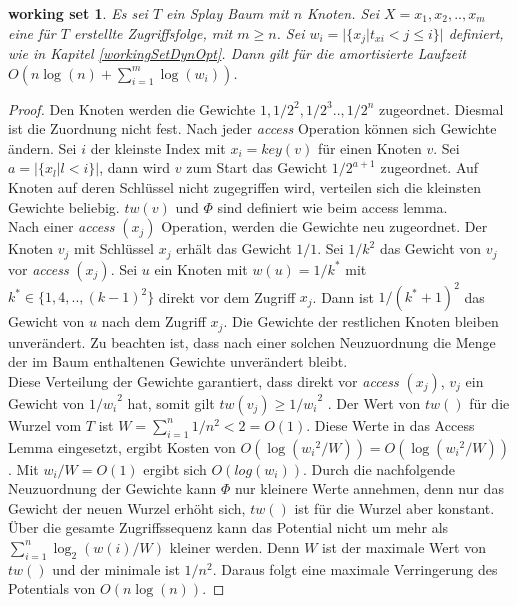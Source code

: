 \documentclass[a4paper,12pt]{article}
\begin{document}
\newtheorem{Satz2}{working set}[section] \label{workingSetSplay}
\begin{Satz2} Es sei $T$ ein Splay Baum mit $n$ Knoten. Sei $X = x_1,x_2,..,x_m$ eine für $T$ erstellte Zugriffsfolge, mit $m \geq n$. Sei ${w_i = \vert\{x_j \vert t_{xi} < j \leq i   \} \vert }$ definiert, wie in Kapitel \ref{workingSetDynOpt}. Dann gilt für die amortisierte Laufzeit \\
	$O\left( n \log\left(n\right) + \sum_{i = 1}^{m} \log\left( w_i\right) \right)$.
\end{Satz2}
\begin{proof}
	Den Knoten werden die Gewichte $1, 1/2^2,1/2^3 .., 1/2^n$ zugeordnet. Diesmal ist die Zuordnung nicht fest. Nach jeder \textit{access} Operation können sich Gewichte ändern. Sei $i$ der kleinste Index mit $x_i = \mathit{key}\left(v\right)$ für einen Knoten $v$. Sei $a = \vert\{x_l \vert l < i\}\vert$, dann wird $v$ zum Start das Gewicht $1 / 2^{a+1}$ zugeordnet. Auf Knoten auf deren Schlüssel nicht zugegriffen wird, verteilen sich die kleinsten Gewichte beliebig. $\mathit{tw}\left(v\right)$ und $\Phi$ sind definiert wie beim access lemma.\\
	Nach einer \textit{access} $\left(x_j\right)$ Operation, werden die Gewichte neu zugeordnet. Der Knoten $v_j$ mit Schlüssel $x_j$ erhält das Gewicht $1/1$. Sei $1/k^2$ das Gewicht von $v_j$ vor \textit{access} $\left(x_j\right)$. Sei $u$ ein Knoten mit $w\left(u\right) = 1 / k^*$ mit  $k^* \in \{1, 4,.., \left(k-1\right)^2\}$ direkt vor dem Zugriff $x_j$. Dann ist $1 /\left(k^* + 1\right)^2$ das Gewicht von $u$ nach dem Zugriff $x_j$. Die Gewichte der restlichen Knoten bleiben unverändert. Zu beachten ist, dass nach einer solchen Neuzuordnung die Menge der im Baum enthaltenen Gewichte unverändert bleibt. \\
	Diese Verteilung der Gewichte garantiert, dass direkt vor  \textit{access} $\left(x_j\right)$, $v_j$ ein Gewicht von ${1 /w_i}^2$ hat, somit gilt $\mathit{tw}\left(v_j\right) \geq {1 /w_i}^2$ . Der Wert von $\mathit{tw}\left(\right)$ für die Wurzel vom $T$ ist $W = \sum_{i = 1}^{n} 1/ n^2 < 2 = O\left(1\right) $. Diese Werte in das Access Lemma eingesetzt, ergibt Kosten von $O\left(\log\left({w_i}^2  / W\right)\right) = O\left(\log\left({w_i}^2 /W  \right)\right)$. Mit $w_i /W = O\left(1\right)$ ergibt sich $O\left(log\left(w_i\right)\right)$. Durch die nachfolgende Neuzuordnung der Gewichte kann $\Phi$ nur kleinere Werte annehmen, denn nur das Gewicht der neuen Wurzel erhöht sich, $\mathit{tw}\left(\right)$ ist für die Wurzel aber konstant.\\
	Über die gesamte Zugriffssequenz kann das Potential nicht um mehr als $\sum_{i = 1}^{n} \log_2\left(w\left(i\right) / W\right)$ kleiner werden. Denn $W$ ist der maximale Wert von $\mathit{tw}\left(\right)$ und  der minimale ist $1 /n^2$. Daraus folgt eine maximale Verringerung des Potentials von $O\left(n \log \left(n\right)\right)$. 
\end{proof}
\end{document}
